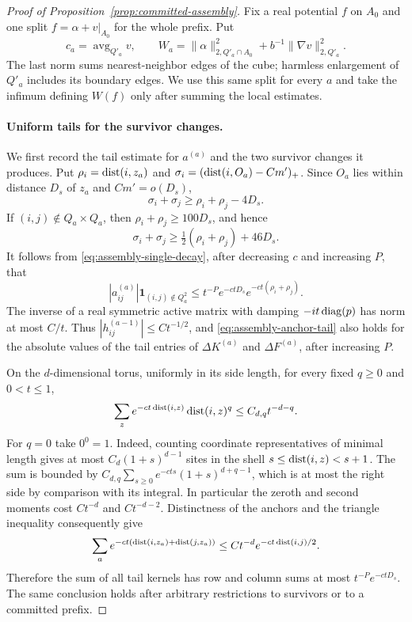 \begin{proof}[Proof of Proposition~\ref{prop:committed-assembly}]
Fix a real potential $f$ on $A_0$ and one split
$f=\alpha+v|_{A_0}$ for the whole prefix. Put
\[
 c_a=\operatorname{avg}_{Q'_a}v,\qquad
 W_a=\|\alpha\|_{2,Q'_a\cap A_0}^2
       +b^{-1}\|\nabla v\|_{2,Q'_a}^2.
\]
The last norm sums nearest-neighbor edges of the cube; harmless enlargement
of $Q'_a$ includes its boundary edges. We use this same split for every
$a$ and take the infimum defining $W(f)$ only after summing the local
estimates.

\paragraph{Uniform tails for the survivor changes.}
We first record the tail estimate for $a^{(a)}$ and the two survivor
changes it produces. Put $\rho_i=\operatorname{dist}(i,z_a)$ and
$\sigma_i=(\operatorname{dist}(i,O_a)-Cm')_+$.  Since $O_a$ lies within distance
$D_s$ of $z_a$ and $Cm'=o(D_s)$,
\[
 \sigma_i+\sigma_j\ge \rho_i+\rho_j-4D_s.
\]
If $(i,j)\notin Q_a\times Q_a$, then $\rho_i+\rho_j\ge100D_s$,
and hence
\[
 \sigma_i+\sigma_j\ge\tfrac12(\rho_i+\rho_j)+46D_s.
\]
It follows from \eqref{eq:assembly-single-decay}, after decreasing
$c$ and increasing $P$, that
\begin{equation}
 |a^{(a)}_{ij}|\mathbf1_{(i,j)\notin Q_a^2}
 \le t^{-P}e^{-ctD_s}e^{-ct(\rho_i+\rho_j)}.
 \label{eq:assembly-anchor-tail}
\end{equation}
The inverse of a real symmetric active matrix with damping
$-it\operatorname{diag}(p)$ has norm at most $C/t$.  Thus
$|h^{(a-1)}_{ij}|\le Ct^{-1/2}$, and
\eqref{eq:assembly-anchor-tail} also holds for the absolute values
of the tail entries of $\Delta K^{(a)}$ and $\Delta F^{(a)}$, after
increasing $P$.

On the $d$-dimensional torus, uniformly in its side length, for every
fixed $q\ge0$ and $0<t\le1$,
\begin{equation}
 \sum_z e^{-ct\operatorname{dist}(i,z)}\operatorname{dist}(i,z)^q
 \le C_{d,q}t^{-d-q}.
 \label{eq:assembly-lattice-moments}
\end{equation}
For $q=0$ take $0^0=1$. Indeed, counting coordinate representatives
of minimal length gives at most $C_d(1+s)^{d-1}$ sites in the shell
$s\le\operatorname{dist}(i,z)<s+1$. The sum is bounded by
$C_{d,q}\sum_{s\ge0}e^{-cts}(1+s)^{d+q-1}$, which is at most the
right side by comparison with its integral. In particular the zeroth
and second moments cost $Ct^{-d}$ and $Ct^{-d-2}$.
Distinctness of the anchors and
the triangle inequality consequently give
\[
 \sum_a e^{-ct(\operatorname{dist}(i,z_a)+\operatorname{dist}(j,z_a))}
 \le Ct^{-d}e^{-ct\operatorname{dist}(i,j)/2}.
\]
Therefore the sum of all tail kernels has row and column sums at
most $t^{-P}e^{-ctD_s}$.  The same conclusion holds after arbitrary
restrictions to survivors or to a committed prefix.


\end{proof}

